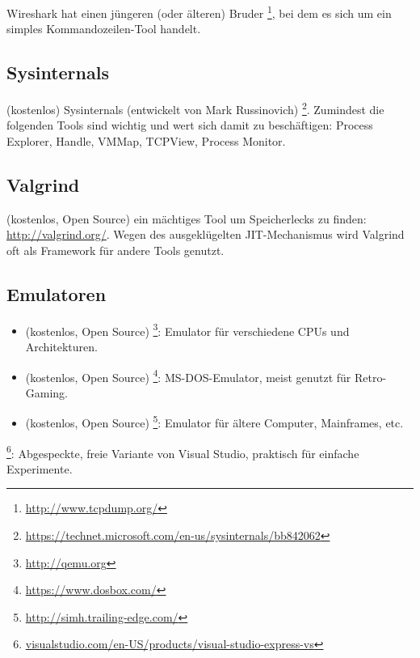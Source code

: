 Wireshark hat einen jüngeren (oder älteren) Bruder \footnote{\url{http://www.tcpdump.org/}},
bei dem es sich um ein simples Kommandozeilen-Tool handelt.

\subsection{Sysinternals}

(kostenlos) Sysinternals (entwickelt von Mark Russinovich)
\footnote{\url{https://technet.microsoft.com/en-us/sysinternals/bb842062}}.
Zumindest die folgenden Tools sind wichtig und wert sich damit zu beschäftigen:
Process Explorer, Handle, VMMap, TCPView, Process Monitor.

\subsection{Valgrind}

(kostenlos, Open Source) ein mächtiges Tool um Speicherlecks zu finden: \url{http://valgrind.org/}.
Wegen des ausgeklügelten \ac{JIT}-Mechanismus wird Valgrind oft als Framework für andere Tools genutzt.


\subsection{Emulatoren}

\begin{itemize}
\item (kostenlos, Open Source) \footnote{\url{http://qemu.org}}: Emulator für verschiedene CPUs und Architekturen.

\item (kostenlos, Open Source) \footnote{\url{https://www.dosbox.com/}}: MS-DOS-Emulator, meist genutzt für Retro-Gaming.

\item (kostenlos, Open Source) \footnote{\url{http://simh.trailing-edge.com/}}: Emulator für ältere Computer, Mainframes, etc.
\end{itemize}


\footnote{\href{http://go.yurichev.com/17034}{visualstudio.com/en-US/products/visual-studio-express-vs}}:
Abgespeckte, freie Variante von Visual Studio, praktisch für einfache Experimente.

